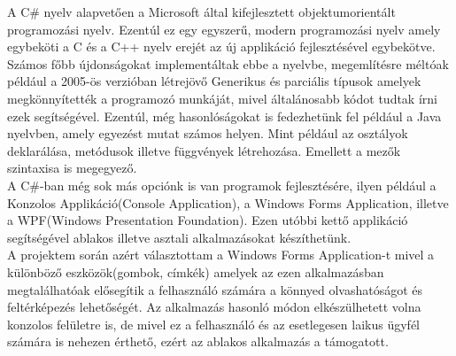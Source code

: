 \documentclass[tocnopagenum]{thesis-ekf}
\theoremstyle{definition}
\theoremstyle{remark}
\begin{document}
	A C\# nyelv alapvetően a Microsoft által kifejlesztett objektumorientált programozási nyelv.
	Ezentúl ez egy egyszerű, modern programozási nyelv amely egybeköti a C és a C++ nyelv erejét az új applikáció fejlesztésével egybekötve. \cite{hejlsberg2003c}
	\\ 
	Számos főbb újdonságokat implementáltak ebbe a nyelvbe, megemlítésre méltóak például a 2005-ös verzióban létrejövő Generikus és parciális típusok amelyek megkönnyítették a programozó munkáját, mivel általánosabb kódot tudtak írni ezek segítségével.
	Ezentúl, még hasonlóságokat is fedezhetünk fel például a Java nyelvben, amely egyezést mutat számos helyen.
	Mint például az osztályok deklarálása, metódusok illetve függvények létrehozása. Emellett a mezők szintaxisa is megegyező.
	\\
	A C\#-ban még sok más opciónk is van programok fejlesztésére, ilyen például a Konzolos Applikáció(Console Application), a Windows Forms Application, illetve a WPF(Windows Presentation Foundation). Ezen utóbbi kettő applikáció segítségével ablakos illetve asztali alkalmazásokat készíthetünk. \cite{almeida2018visual}
	\\
	A projektem során azért választottam a Windows Forms Application-t mivel a különböző eszközök(gombok, címkék) amelyek az ezen alkalmazásban megtalálhatóak elősegítik a felhasználó számára a könnyed olvashatóságot és feltérképezés lehetőségét. Az alkalmazás hasonló módon elkészülhetett volna konzolos felületre is, de mivel ez a felhasználó és az esetlegesen laikus ügyfél számára is nehezen érthető, ezért az ablakos alkalmazás a támogatott.
	\\ 
\end{document}
